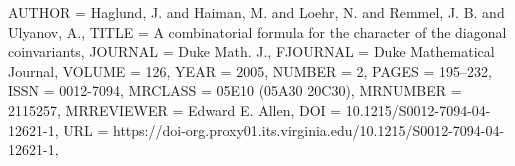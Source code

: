 \documentclass[dvipsnames]{beamer}
\theoremstyle{definition}
\newcounter{c}
\begin{document}
\begin{frame}[shrink=10]
\begin{bibdiv}
\begin{biblist}
{    AUTHOR = {Haglund, J. and Haiman, M. and Loehr, N. and Remmel, J. B. and
              Ulyanov, A.},
     TITLE = {A combinatorial formula for the character of the diagonal
              coinvariants},
   JOURNAL = {Duke Math. J.},
  FJOURNAL = {Duke Mathematical Journal},
    VOLUME = {126},
      YEAR = {2005},
    NUMBER = {2},
     PAGES = {195--232},
      ISSN = {0012-7094},
   MRCLASS = {05E10 (05A30 20C30)},
  MRNUMBER = {2115257},
MRREVIEWER = {Edward E. Allen},
       DOI = {10.1215/S0012-7094-04-12621-1},
       URL = {https://doi-org.proxy01.its.virginia.edu/10.1215/S0012-7094-04-12621-1},
}


\end{biblist}
\end{bibdiv}
\end{frame}
\end{document}
